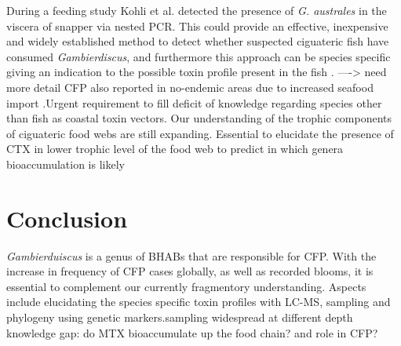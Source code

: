 \documentclass[12pt]{article}
\begin{document}
During a feeding study Kohli et al. detected the presence of \emph{G. australes} in the viscera of snapper via nested PCR. This could provide an effective, inexpensive and widely established method to detect whether suspected ciguateric fish have consumed \emph{Gambierdiscus}, and furthermore this approach can be species specific giving an indication to the possible toxin profile present in the fish \cite{kohli2014feeding}.
----> need more detail
CFP also reported in no-endemic areas due to increased seafood import \cite{glaziou1994epidemiology,ting2001ciguatera}.Urgent requirement to fill deficit of knowledge regarding species other than fish as coastal toxin vectors. 
Our understanding of the trophic components of ciguateric food webs are still expanding.
Essential to elucidate the presence of CTX in lower trophic level of the food web to predict in which genera bioaccumulation is likely \cite{mak2013pacific}



\section{Conclusion}
\emph{Gambierduiscus} is a genus of BHABs that are responsible for CFP. With the increase in frequency of CFP cases globally, as well as recorded blooms, it is essential to complement our currently fragmentory understanding. Aspects include elucidating the species specific toxin profiles with LC-MS, sampling and phylogeny using genetic markers.sampling widespread at different depth 
knowledge gap: do MTX bioaccumulate up the food chain? and role in CFP?
\newpage



\end{document}
